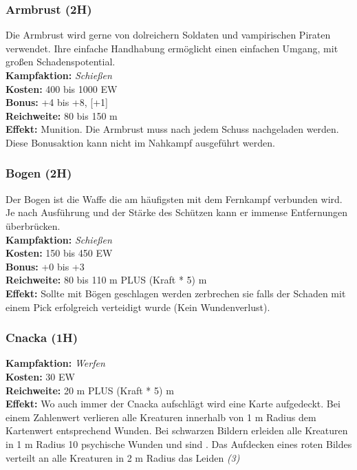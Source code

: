 \subsubsection*{Armbrust (2H)}
Die Armbrust wird gerne von dolreichern Soldaten und vampirischen Piraten verwendet. Ihre einfache Handhabung ermöglicht einen einfachen Umgang, mit großen Schadenspotential.\\
\textbf{Kampfaktion:} \textit{Schießen}\\
\textbf{Kosten:} 400 bis 1000 EW\\
\textbf{Bonus:} +4 bis +8, [+1]\\
\textbf{Reichweite:} 80 bis 150 m\\
\textbf{Effekt:} Munition. Die Armbrust muss nach jedem Schuss nachgeladen werden. Diese Bonusaktion kann nicht im Nahkampf ausgeführt werden.

\subsubsection*{Bogen (2H)} \label{ar:bogen}
Der Bogen ist die Waffe die am häufigsten mit dem Fernkampf verbunden wird. Je nach Ausführung und der Stärke des Schützen kann er immense Entfernungen überbrücken.\\
\textbf{Kampfaktion:} \textit{Schießen}\\
\textbf{Kosten:} 150 bis 450 EW\\
\textbf{Bonus:} +0 bis +3\\
\textbf{Reichweite:} 80 bis 110 m  PLUS (Kraft * 5) m\\
\textbf{Effekt:} Sollte mit Bögen geschlagen werden zerbrechen sie falls der Schaden mit einem Pick erfolgreich verteidigt wurde (Kein Wundenverlust).

\subsubsection*{Cnacka (1H)} \label{ar:cnacka}
\textbf{Kampfaktion:} \textit{Werfen}\\
\textbf{Kosten:} 30 EW\\
\textbf{Reichweite:} 20 m PLUS (Kraft * 5) m\\
\textbf{Effekt:} Wo auch immer der Cnacka aufschlägt wird eine Karte aufgedeckt. Bei einem Zahlenwert verlieren alle Kreaturen innerhalb von 1 m Radius dem Kartenwert entsprechend Wunden. Bei schwarzen Bildern erleiden alle Kreaturen in 1 m  Radius 10 psychische Wunden und sind \textit{}. Das Aufdecken eines roten Bildes verteilt an alle Kreaturen in 2 m Radius das Leiden \textit{(3)}

